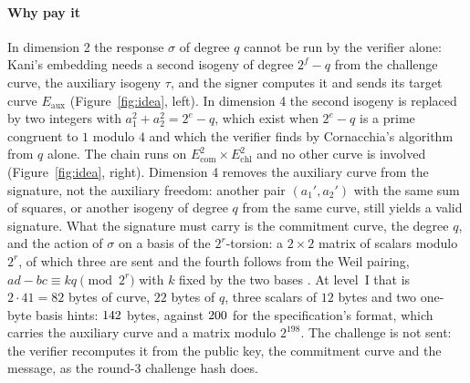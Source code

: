 \documentclass[11pt]{article}
\newcommand{\Ecom}{E_{\mathrm{com}}}
\newcommand{\Echl}{E_{\mathrm{chl}}}
\newcommand{\Eaux}{E_{\mathrm{aux}}}
\begin{document}
\paragraph{Why pay it}
In dimension 2 the response $\sigma$ of degree $q$ cannot be run by the
verifier alone: Kani's embedding needs a second isogeny of degree
$2^f - q$ from the challenge curve, the auxiliary isogeny $\tau$, and the
signer computes it and sends its target curve $\Eaux$
(Figure~\ref{fig:idea}, left).  In dimension 4 the second isogeny is
replaced by two integers with $a_1^2 + a_2^2 = 2^e - q$, which exist when
$2^e - q$ is a prime congruent to $1$ modulo $4$ and which the verifier
finds by Cornacchia's algorithm from $q$ alone.  The chain runs on
$\Ecom^2 \times \Echl^2$ and no other curve is involved
(Figure~\ref{fig:idea}, right).  Dimension 4 removes the auxiliary curve
from the signature, not the auxiliary freedom: another pair $(a_1', a_2')$
with the same sum of squares, or another isogeny of degree $q$ from the
same curve, still yields a valid signature.  What the signature must carry
is the
commitment curve, the degree $q$, and the action of $\sigma$ on a basis of
the $2^r$-torsion: a $2 \times 2$ matrix of scalars modulo $2^r$, of which
three are sent and the fourth follows from the Weil pairing,
$a d - b c \equiv k q \pmod{2^r}$ with $k$ fixed by the two bases
\cite[Section~6.1]{DLRW24}.
At level~I that is $2 \cdot 41 = 82$ bytes of curve, $22$ bytes of $q$,
three scalars of $12$ bytes and two one-byte basis hints:
$142$ bytes, against $200$ for the specification's format,
which carries the auxiliary curve and a matrix modulo $2^{198}$.
The challenge is not sent: the verifier recomputes it from the public key,
the commitment curve and the message, as the round-3 challenge hash does.
\end{document}
